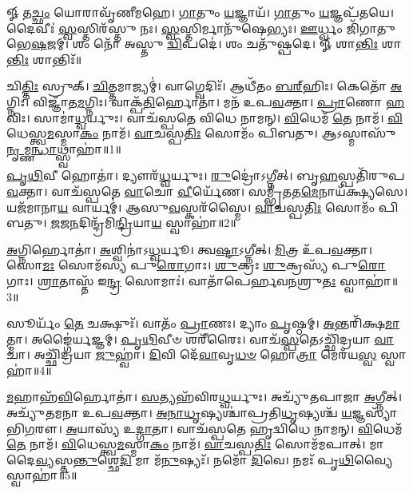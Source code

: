 \setcounter{anuvakam}{0}
𑍐 𑌤\-\ul{𑌚𑍍𑌛𑌂} 𑌯𑍋𑌰𑌾𑌵𑍃᳴𑌣𑍀𑌮𑌹𑍇। 
\-\ul{𑌗𑌾}\-𑌤𑍁𑌂 \ul{𑌯}\-𑌜𑍍𑌞𑌾𑌯᳴। 
\-\ul{𑌗𑌾}\-𑌤𑍁𑌂 \ul{𑌯}\-𑌜𑍍𑌞𑌪᳴𑌤𑌯𑍇। 
𑌦𑍈𑌵𑍀𑌃॑ \ul{𑌸𑍍𑌵}\-𑌸𑍍𑌤𑌿𑌰᳴𑌸𑍍𑌤𑍁 𑌨𑌃। 
\-\ul{𑌸𑍍𑌵}\-𑌸𑍍𑌤𑌿𑌰𑍍𑌮𑌾𑌨𑍁᳴𑌷𑍇𑌭𑍍𑌯𑌃। 
\-\ul{𑌊}\-𑌰𑍍𑌧𑍍𑌵𑌂 𑌜𑌿᳴𑌗𑌾𑌤𑍁 𑌭𑍇\-\ul{𑌷}\-𑌜𑌮𑍍। 
𑌶𑌂 𑌨𑍋᳴ 𑌅𑌸𑍍𑌤𑍁 \ul{𑌦𑍍𑌵𑌿}\-𑌪𑌦𑍇॑। 
𑌶𑌂 𑌚𑌤𑍁᳴𑌷𑍍𑌪𑌦𑍇। 
𑍐 𑌶𑌾\-\ul{𑌨𑍍𑌤𑌿𑌃} 𑌶𑌾\-\ul{𑌨𑍍𑌤𑌿𑌃} 𑌶𑌾𑌨𑍍𑌤𑌿𑌃᳴॥

𑌚𑌿\-\ul{𑌤𑍍𑌤𑌿𑌃} 𑌸𑍍𑌰𑍁𑌕𑍍। 
\-\ul{𑌚𑌿}\-𑌤𑍍𑌤𑌮𑌾𑌜𑍍𑌯𑌮𑍍॑। 
𑌵𑌾𑌗𑍍𑌵𑍇𑌦𑌿𑌃᳴। 
𑌆𑌧𑍀᳴𑌤𑌂 \ul{𑌬}\-\-\ul{𑌰𑍍}\-‌𑌹𑌿𑌃। 
𑌕𑍇𑌤𑍋᳴ \ul{𑌅}\-𑌗𑍍𑌨𑌿𑌃। 
𑌵𑌿𑌜𑍍𑌞𑌾᳴𑌤\-\ul{𑌮}\-𑌗𑍍𑌨𑌿𑌃। 
𑌵𑌾𑌕𑍍𑌪᳴\-\ul{𑌤𑌿}\-𑌰𑍍\mbox{}𑌹𑍋𑌤𑌾॑। 
𑌮𑌨᳴ 𑌉𑌪\-\ul{𑌵}\-𑌕𑍍𑌤𑌾। 
\-\ul{𑌪𑍍𑌰𑌾}\-𑌣𑍋 \ul{𑌹}\-𑌵𑌿𑌃। 
𑌸𑌾𑌮𑌾॑\-\ul{𑌧𑍍𑌵}\-𑌰𑍍𑌯𑍁𑌃। 
𑌵𑌾𑌚᳴𑌸𑍍𑌪𑌤𑍇 𑌵𑌿𑌧𑍇 𑌨𑌾𑌮𑌨𑍍। 
\-\ul{𑌵𑌿}\-𑌧𑍇𑌮᳴ \ul{𑌤𑍇} 𑌨𑌾𑌮᳴। 
\-\ul{𑌵𑌿}\-𑌧𑍇𑌸𑍍𑌤𑍍𑌵\-\ul{𑌮}\-𑌸𑍍𑌮𑌾\-\ul{𑌕𑌂} 𑌨𑌾𑌮᳴। 
\-\ul{𑌵𑌾}\-𑌚𑌸𑍍𑌪\-\ul{𑌤𑌿𑌃} 𑌸𑍋𑌮𑌂᳴ 𑌪𑌿𑌬𑌤𑍁। 
𑌆𑌽𑌸𑍍𑌮𑌾𑌸𑍁᳴ \ul{𑌨𑍃}\-𑌮𑍍𑌣\-\ul{𑌨𑍍𑌧𑌾}\-𑌥𑍍𑌸𑍍𑌵𑌾𑌹𑌾॑॥1॥
\anuvakamend[\-\ul{𑌅}\-\-\ul{𑌧𑍍𑌵}\-𑌰𑍍𑌯𑍁𑌃 𑌪𑌞𑍍𑌚᳴ 𑌚]

\-\ul{𑌪𑍃}\-\-\ul{𑌥𑌿}\-𑌵𑍀 𑌹𑍋𑌤𑌾॑। 
𑌦𑍍𑌯𑍗𑌰᳴\-\ul{𑌧𑍍𑌵}\-𑌰𑍍𑌯𑍁𑌃। 
\-\ul{𑌰𑍁}\-𑌦𑍍𑌰𑍋॑𑌽𑌗𑍍𑌨𑍀𑌤𑍍। 
𑌬𑍃\-\ul{𑌹}\-𑌸𑍍𑌪𑌤𑌿᳴𑌰𑍁𑌪\-\ul{𑌵}\-𑌕𑍍𑌤𑌾। 
𑌵𑌾𑌚᳴𑌸𑍍𑌪𑌤𑍇 \ul{𑌵𑌾}\-𑌚𑍋 \ul{𑌵𑍀}\-𑌰𑍍𑌯𑍇᳴𑌣। 
𑌸𑌮𑍍𑌭𑍃᳴𑌤𑌤\-\ul{𑌮𑍇}\-𑌨𑌾𑌯᳴𑌕𑍍𑌷𑍍𑌯𑌸𑍇। 
𑌯𑌜᳴𑌮𑌾𑌨𑌾\-\ul{𑌯} 𑌵𑌾𑌰𑍍𑌯𑌮𑍍॑। 
𑌆𑌸𑍁\-\ul{𑌵}\-𑌸𑍍𑌕𑌰᳴𑌸𑍍𑌮𑍈। 
\-\ul{𑌵𑌾}\-𑌚𑌸𑍍𑌪\-\ul{𑌤𑌿𑌃} 𑌸𑍋𑌮𑌂᳴ 𑌪𑌿𑌬𑌤𑍁। 
\-\ul{𑌜}\-𑌜\-\ul{𑌨}\-𑌦𑌿𑌨𑍍𑌦𑍍𑌰᳴\-𑌮𑌿\-\ul{𑌨𑍍𑌦𑍍𑌰𑌿}\-𑌯𑌾\-\ul{𑌯} 𑌸𑍍𑌵𑌾𑌹𑌾॑॥2॥%
\anuvakamend[\-\ul{𑌪𑍃}\-\-\ul{𑌥𑌿}\-𑌵𑍀 𑌹𑍋\-\ul{𑌤𑌾} 𑌦𑌶᳴]

\-\ul{𑌅}\-𑌗𑍍𑌨𑌿𑌰𑍍\mbox{}𑌹𑍋𑌤𑌾॑। 
\-\ul{𑌅}\-𑌶𑍍𑌵𑌿𑌨𑌾॑𑌽\-\ul{𑌧𑍍𑌵}\-𑌰𑍍𑌯𑍂। 
𑌤𑍍𑌵\-\ul{𑌷𑍍𑌟𑌾}\-𑌽𑌗𑍍𑌨𑍀𑌤𑍍। 
\-\ul{𑌮𑌿}\-𑌤𑍍𑌰 𑌉᳴𑌪\-\ul{𑌵}\-𑌕𑍍𑌤𑌾। 
𑌸𑍋\-\ul{𑌮𑌃} 𑌸𑍋𑌮᳴𑌸𑍍𑌯 𑌪𑍁\-\ul{𑌰𑍋}\-𑌗𑌾𑌃। 
\-\ul{𑌶𑍁}\-𑌕𑍍𑌰𑌃  \ul{𑌶𑍁}\-𑌕𑍍𑌰𑌸𑍍𑌯᳴ 𑌪𑍁\-\ul{𑌰𑍋}\-𑌗𑌾𑌃। 
\-\ul{𑌶𑍍𑌰𑌾}\-𑌤𑌾𑌸𑍍𑌤᳴ 𑌇\-\ul{𑌨𑍍𑌦𑍍𑌰} 𑌸𑍋𑌮𑌾𑌃॑। 
𑌵𑌾𑌤𑌾᳴𑌪𑍇𑌰𑍍\mbox{}𑌹𑌵\-\ul{𑌨}\-𑌶𑍍𑌰𑍁\-\ul{𑌤𑌃} 𑌸𑍍𑌵𑌾𑌹𑌾॑॥3॥%
\anuvakamend[\-\ul{𑌅}\-𑌗𑍍𑌨𑌿𑌰𑍍𑌹𑍋\-\ul{𑌤𑌾}\-𑌽𑌷𑍍𑌟𑍗]

𑌸𑍂𑌰𑍍𑌯𑌂᳴ \ul{𑌤𑍇} 𑌚𑌕𑍍𑌷𑍁𑌃᳴। 
𑌵𑌾𑌤𑌂᳴ \ul{𑌪𑍍𑌰𑌾}\-𑌣𑌃। 
𑌦𑍍𑌯𑌾𑌂 \ul{𑌪𑍃}\-𑌷𑍍𑌠𑌮𑍍। 
\-\ul{𑌅}\-𑌨𑍍𑌤𑌰𑌿᳴𑌕𑍍𑌷\-\ul{𑌮𑌾}\-𑌤𑍍𑌮𑌾। 
𑌅𑌙𑍍𑌗𑍈॑𑌰𑍍\mbox{}\-\ul{𑌯}\-𑌜𑍍𑌞𑌮𑍍। 
\-\ul{𑌪𑍃}\-\-\ul{𑌥𑌿}\-𑌵𑍀𑍞 𑌶𑌰𑍀᳴𑌰𑍈𑌃। 
𑌵𑌾𑌚᳴\-\ul{𑌸𑍍𑌪}\-𑌤𑍇𑌽𑌚𑍍𑌛𑌿᳴𑌦𑍍𑌰𑌯𑌾 \ul{𑌵𑌾}\-𑌚𑌾। 
𑌅𑌚𑍍𑌛𑌿᳴𑌦𑍍𑌰𑌯𑌾 \ul{𑌜𑍁}\-𑌹𑍍𑌵𑌾॑। 
\-\ul{𑌦𑌿}\-𑌵𑌿 𑌦𑍇᳴\-\ul{𑌵𑌾}\-𑌵𑍃\-\ul{𑌧}\-\-\ul{𑍞} 𑌹𑍋\-\ul{𑌤𑍍𑌰𑌾} 𑌮𑍇𑌰᳴𑌯\-\ul{𑌸𑍍𑌵} 𑌸𑍍𑌵𑌾𑌹𑌾॑॥4॥%
\anuvakamend[𑌸𑍂𑌰𑍍𑌯𑌂᳴ \ul{𑌤𑍇} 𑌨𑌵᳴]

\-\ul{𑌮}\-𑌹𑌾𑌹᳴\-\ul{𑌵𑌿}\-𑌰𑍍\mbox{}𑌹𑍋𑌤𑌾॑। 
\-\ul{𑌸}\-𑌤𑍍𑌯𑌹᳴𑌵𑌿𑌰\-\ul{𑌧𑍍𑌵}\-𑌰𑍍𑌯𑍁𑌃। 
𑌅𑌚𑍍𑌯𑍁᳴𑌤𑌪𑌾𑌜𑌾 \ul{𑌅}\-𑌗𑍍𑌨𑍀𑌤𑍍। 
𑌅𑌚𑍍𑌯𑍁᳴𑌤𑌮𑌨𑌾 𑌉𑌪\-\ul{𑌵}\-𑌕𑍍𑌤𑌾। 
\-\ul{𑌅}\-\-\ul{𑌨𑌾}\-\-\ul{𑌧𑍃}\-𑌷𑍍𑌯𑌶𑍍𑌚𑌾॑𑌪𑍍𑌰𑌤𑌿\-\ul{𑌧𑍃}\-𑌷𑍍𑌯𑌶𑍍𑌚᳴ \ul{𑌯}\-𑌜𑍍𑌞𑌸𑍍𑌯𑌾᳴𑌭𑌿\-\ul{𑌗}\-𑌰𑍗। 
\-\ul{𑌅}\-𑌯𑌾𑌸𑍍𑌯᳴ 𑌉\-\ul{𑌦𑍍𑌗𑌾}\-𑌤𑌾। 
𑌵𑌾𑌚᳴𑌸𑍍𑌪𑌤𑍇 𑌹𑍃𑌦𑍍𑌵𑌿𑌧𑍇 𑌨𑌾𑌮𑌨𑍍। 
\-\ul{𑌵𑌿}\-𑌧𑍇𑌮᳴ \ul{𑌤𑍇} 𑌨𑌾𑌮᳴। 
\-\ul{𑌵𑌿}\-𑌧𑍇𑌸𑍍𑌤𑍍𑌵\-\ul{𑌮}\-𑌸𑍍𑌮𑌾\-\ul{𑌕𑌂} 𑌨𑌾𑌮᳴। 
\-\ul{𑌵𑌾}\-𑌚𑌸𑍍𑌪\-\ul{𑌤𑌿𑌃} 𑌸𑍋𑌮᳴𑌮𑌪𑌾𑌤𑍍। 
𑌮𑌾 𑌦𑍈\-\ul{𑌵𑍍𑌯}\-𑌸𑍍𑌤\-\ul{𑌨𑍍𑌤𑍁}\-𑌶𑍍𑌛𑍇\-\ul{𑌦𑌿} 𑌮𑌾 𑌮᳴\-\ul{𑌨𑍁}\-𑌷𑍍𑌯𑌃᳴। 
𑌨𑌮𑍋᳴ \ul{𑌦𑌿}\-𑌵𑍇। 
𑌨𑌮𑌃᳴ 𑌪𑍃\-\ul{𑌥𑌿}\-𑌵𑍍𑌯𑍈 𑌸𑍍𑌵𑌾𑌹𑌾॑॥5॥%
\anuvakamend[\-\ul{𑌅}\-\-\ul{𑌪𑌾}\-𑌤𑍍𑌤𑍍𑌰𑍀𑌣𑌿᳴ 𑌚]


